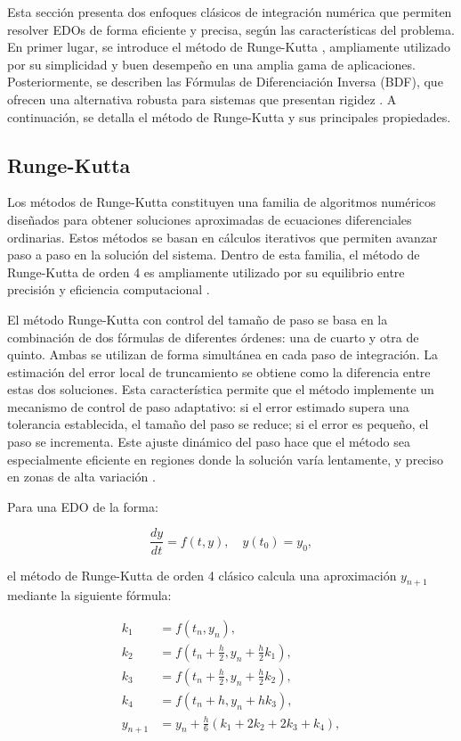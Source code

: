 Esta sección presenta dos enfoques clásicos de integración numérica que permiten resolver EDOs de forma eficiente y precisa, según las características del problema. 
En primer lugar, se introduce el método de Runge-Kutta \cite{Burden2011}, ampliamente utilizado por su simplicidad y buen desempeño en una amplia gama de aplicaciones. 
Posteriormente, se describen las Fórmulas de Diferenciación Inversa (BDF), que ofrecen una alternativa robusta para sistemas que presentan rigidez \cite{Hairer1996}. 
A continuación, se detalla el método de Runge-Kutta y sus principales propiedades.

\subsection{Runge-Kutta}

Los métodos de Runge-Kutta constituyen una familia de algoritmos numéricos diseñados para obtener soluciones aproximadas de ecuaciones diferenciales ordinarias. 
Estos métodos se basan en cálculos iterativos que permiten avanzar paso a paso en la solución del sistema. Dentro de esta familia, el método de Runge-Kutta de orden 
4 es ampliamente utilizado por su equilibrio entre precisión y eficiencia computacional \cite{Fehlberg70, DormandPrince80}.

El método Runge-Kutta con control del tamaño de paso se basa en la combinación de dos fórmulas de diferentes órdenes: una de cuarto y otra de quinto. Ambas se utilizan 
de forma simultánea en cada paso de integración. La estimación del error local de truncamiento se obtiene como la diferencia entre estas dos soluciones. Esta 
característica permite que el método implemente un mecanismo de control de paso adaptativo: si el error estimado supera una tolerancia establecida, el tamaño del paso 
se reduce; si el error es pequeño, el paso se incrementa. Este ajuste dinámico del paso hace que el método sea especialmente eficiente en regiones donde la solución 
varía lentamente, y preciso en zonas de alta variación \cite{HairerNorsettWanner93}.

Para una EDO de la forma:

\[
\frac{dy}{dt} = f(t, y), \quad y(t_0) = y_0,
\]

el método de Runge-Kutta de orden 4 clásico calcula una aproximación \( y_{n+1} \) mediante la siguiente fórmula:

\[
\begin{aligned}
k_1 &= f(t_n, y_n), \\
k_2 &= f\left(t_n + \frac{h}{2}, y_n + \frac{h}{2}k_1\right), \\
k_3 &= f\left(t_n + \frac{h}{2}, y_n + \frac{h}{2}k_2\right), \\
k_4 &= f(t_n + h, y_n + hk_3), \\
y_{n+1} &= y_n + \frac{h}{6}(k_1 + 2k_2 + 2k_3 + k_4),
\end{aligned}
\]

